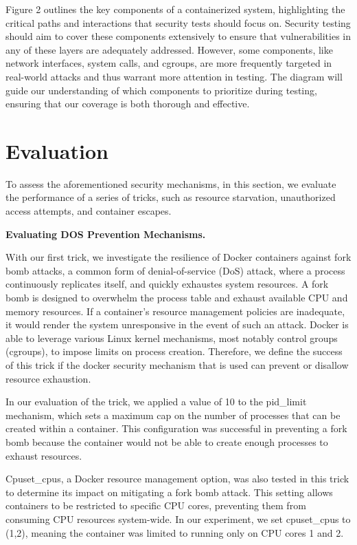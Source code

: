 Figure 2 outlines the key components of a containerized system, highlighting the critical paths and interactions that security tests should focus on. Security testing should aim to cover these components extensively to ensure that vulnerabilities in any of these layers are adequately addressed. However, some components, like network interfaces, system calls, and cgroups, are more frequently targeted in real-world attacks and thus warrant more attention in testing. The diagram will guide our understanding of which components to prioritize during testing, ensuring that our coverage is both thorough and effective.


\section{Evaluation}
\label{sec:evaluation}

To assess the aforementioned security mechanisms, in this section, we evaluate the performance of a series of tricks, such as resource starvation, unauthorized access attempts, and container escapes.

\noindent\textbf{Evaluating DOS Prevention Mechanisms.}

With our first trick, we investigate the resilience of Docker containers against fork bomb attacks, a common form of denial-of-service (DoS) attack, where a process continuously replicates itself, and quickly exhaustes system resources. A fork bomb is designed to overwhelm the process table and exhaust available CPU and memory resources. If a container's resource management policies are inadequate, it would render the system unresponsive in the event of such an attack. Docker is able to leverage various Linux kernel mechanisms, most notably control groups (cgroups), to impose limits on process creation. Therefore, we define the success of this trick if the docker security mechanism that is used can prevent or disallow resource exhaustion. 

In our evaluation of the trick, we applied a value of 10 to the pid\_limit mechanism, which sets a maximum cap on the number of processes that can be created within a container. This configuration was successful in preventing a fork bomb because the container would not be able to create enough processes to exhaust resources.

Cpuset\_cpus, a Docker resource management option, was also tested in this trick to determine its impact on mitigating a fork bomb attack. This setting allows containers to be restricted to specific CPU cores, preventing them from consuming CPU resources system-wide. In our experiment, we set cpuset\_cpus to (1,2), meaning the container was limited to running only on CPU cores 1 and 2.

